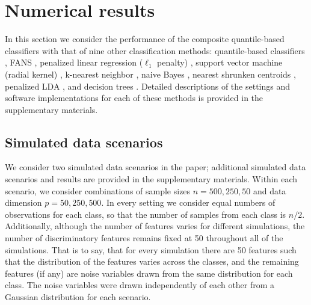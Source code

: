 

\section{Numerical results}
\label{sec:numerical-results}

In this section we consider the performance of the composite quantile-based
classifiers with that of nine other classification methods: quantile-based
classifiers \cite{hennig2016}, FANS \cite{fan2016}, penalized linear regression
($\ell_1$ penalty) \cite{park2007}, support vector machine (radial kernel)
\cite{cortes1995}, k-nearest neighbor \cite{cover1967}, naive Bayes
\cite{hastie2009}, nearest shrunken centroids \cite{tibshirani2002}, penalized
LDA \cite{witten2011}, and decision trees \cite{breiman1984}.  Detailed
descriptions of the settings and software implementations for each of these
methods is provided in the supplementary materials.


\subsection{Simulated data scenarios}
\label{sec:simulated-data-scenarios}

We consider two simulated data scenarios in the paper; additional simulated data
scenarios and results are provided in the supplementary materials.  Within each
scenario, we consider combinations of sample sizes $n = 500, 250, 50$ and data
dimension $p = 50, 250, 500$.  In every setting we consider equal numbers of
observations for each class, so that the number of samples from each class is
$n / 2$.  Additionally, although the number of features varies for different
simulations, the number of discriminatory features remains fixed at 50
throughout all of the simulations.  That is to say, that for every simulation
there are 50 features such that the distribution of the features varies across
the classes, and the remaining features (if any) are noise variables drawn from
the same distribution for each class.  The noise variables were drawn
independently of each other from a Gaussian distribution for each scenario.


